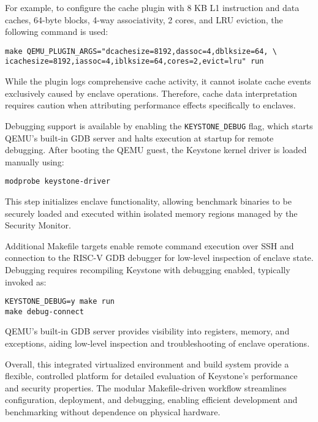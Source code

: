 For example, to configure the cache plugin with 8 KB L1 instruction and data caches, 64-byte blocks, 4-way associativity, 2 cores, and LRU eviction, the following command is used:

\begin{lstlisting}
make QEMU_PLUGIN_ARGS="dcachesize=8192,dassoc=4,dblksize=64, \
icachesize=8192,iassoc=4,iblksize=64,cores=2,evict=lru" run
\end{lstlisting}

While the plugin logs comprehensive cache activity, it cannot isolate cache events exclusively caused by enclave operations. Therefore, cache data interpretation requires caution when attributing performance effects specifically to enclaves.

Debugging support is available by enabling the \texttt{KEYSTONE\_DEBUG} flag, which starts QEMU’s built-in GDB server and halts execution at startup for remote debugging. After booting the QEMU guest, the Keystone kernel driver is loaded manually using:

\begin{lstlisting}
modprobe keystone-driver
\end{lstlisting}

This step initializes enclave functionality, allowing benchmark binaries to be securely loaded and executed within isolated memory regions managed by the Security Monitor.

Additional Makefile targets enable remote command execution over SSH and connection to the RISC-V GDB debugger for low-level inspection of enclave state. Debugging requires recompiling Keystone with debugging enabled, typically invoked as:

\begin{lstlisting}
KEYSTONE_DEBUG=y make run
make debug-connect
\end{lstlisting}

QEMU’s built-in GDB server provides visibility into registers, memory, and exceptions, aiding low-level inspection and troubleshooting of enclave operations.

Overall, this integrated virtualized environment and build system provide a flexible, controlled platform for detailed evaluation of Keystone’s performance and security properties. The modular Makefile-driven workflow streamlines configuration, deployment, and debugging, enabling efficient development and benchmarking without dependence on physical hardware. %


